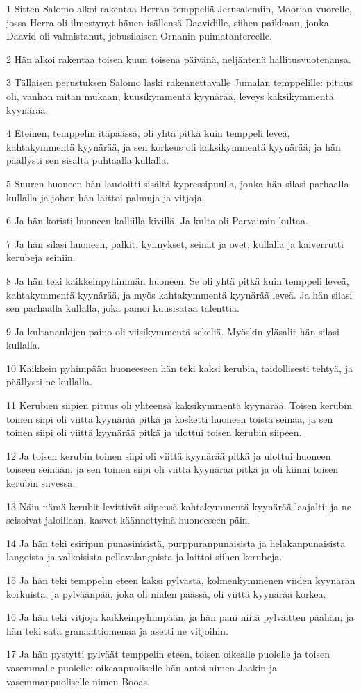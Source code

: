 \par 1 Sitten Salomo alkoi rakentaa Herran temppeliä Jerusalemiin, Moorian vuorelle, jossa Herra oli ilmestynyt hänen isällensä Daavidille, siihen paikkaan, jonka Daavid oli valmistanut, jebusilaisen Ornanin puimatantereelle.
\par 2 Hän alkoi rakentaa toisen kuun toisena päivänä, neljäntenä hallitusvuotenansa.
\par 3 Tällaisen perustuksen Salomo laski rakennettavalle Jumalan temppelille: pituus oli, vanhan mitan mukaan, kuusikymmentä kyynärää, leveys kaksikymmentä kyynärää.
\par 4 Eteinen, temppelin itäpäässä, oli yhtä pitkä kuin temppeli leveä, kahtakymmentä kyynärää, ja sen korkeus oli kaksikymmentä kyynärää; ja hän päällysti sen sisältä puhtaalla kullalla.
\par 5 Suuren huoneen hän laudoitti sisältä kypressipuulla, jonka hän silasi parhaalla kullalla ja johon hän laittoi palmuja ja vitjoja.
\par 6 Ja hän koristi huoneen kalliilla kivillä. Ja kulta oli Parvaimin kultaa.
\par 7 Ja hän silasi huoneen, palkit, kynnykset, seinät ja ovet, kullalla ja kaiverrutti kerubeja seiniin.
\par 8 Ja hän teki kaikkeinpyhimmän huoneen. Se oli yhtä pitkä kuin temppeli leveä, kahtakymmentä kyynärää, ja myös kahtakymmentä kyynärää leveä. Ja hän silasi sen parhaalla kullalla, joka painoi kuusisataa talenttia.
\par 9 Ja kultanaulojen paino oli viisikymmentä sekeliä. Myöskin yläsalit hän silasi kullalla.
\par 10 Kaikkein pyhimpään huoneeseen hän teki kaksi kerubia, taidollisesti tehtyä, ja päällysti ne kullalla.
\par 11 Kerubien siipien pituus oli yhteensä kaksikymmentä kyynärää. Toisen kerubin toinen siipi oli viittä kyynärää pitkä ja kosketti huoneen toista seinää, ja sen toinen siipi oli viittä kyynärää pitkä ja ulottui toisen kerubin siipeen.
\par 12 Ja toisen kerubin toinen siipi oli viittä kyynärää pitkä ja ulottui huoneen toiseen seinään, ja sen toinen siipi oli viittä kyynärää pitkä ja oli kiinni toisen kerubin siivessä.
\par 13 Näin nämä kerubit levittivät siipensä kahtakymmentä kyynärää laajalti; ja ne seisoivat jaloillaan, kasvot käännettyinä huoneeseen päin.
\par 14 Ja hän teki esiripun punasinisistä, purppuranpunaisista ja helakanpunaisista langoista ja valkoisista pellavalangoista ja laittoi siihen kerubeja.
\par 15 Ja hän teki temppelin eteen kaksi pylvästä, kolmenkymmenen viiden kyynärän korkuista; ja pylväänpää, joka oli niiden päässä, oli viittä kyynärää korkea.
\par 16 Ja hän teki vitjoja kaikkeinpyhimpään, ja hän pani niitä pylväitten päähän; ja hän teki sata granaattiomenaa ja asetti ne vitjoihin.
\par 17 Ja hän pystytti pylväät temppelin eteen, toisen oikealle puolelle ja toisen vasemmalle puolelle: oikeanpuoliselle hän antoi nimen Jaakin ja vasemmanpuoliselle nimen Booas.

